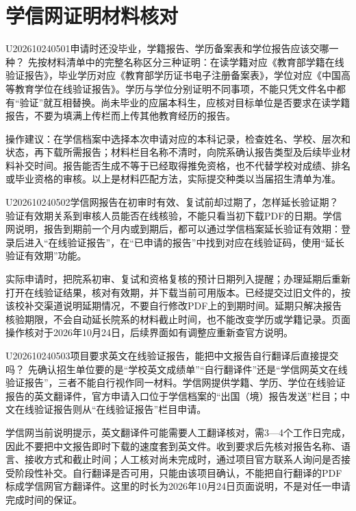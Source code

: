 \section{学信网证明材料核对}
\begin{qa}{U202610240501}{申请时还没毕业，学籍报告、学历备案表和学位报告应该交哪一种？}
先按材料清单中的完整名称区分三种证明：在读学籍对应《教育部学籍在线验证报告》，毕业学历对应《教育部学历证书电子注册备案表》，学位对应《中国高等教育学位在线验证报告》。学历与学位分别证明不同事项，不能只凭文件名中都有“验证”就互相替换。尚未毕业的应届本科生，应核对目标单位是否要求在读学籍报告，不要为填满上传栏而上传其他教育经历的报告。

操作建议：在学信档案中选择本次申请对应的本科记录，检查姓名、学校、层次和状态，再下载所需报告；材料栏目名称不清时，向院系确认报告类型及后续毕业材料补交时间。报告能否生成不等于已经取得推免资格，也不代替学校对成绩、排名或毕业资格的审核。以上是材料匹配方法，实际提交种类以当届招生清单为准。
\end{qa}
\begin{qa}{U202610240502}{学信网报告在初审时有效、复试前却过期了，怎样延长验证期？}
验证有效期关系到审核人员能否在线核验，不能只看当初下载PDF的日期。学信网说明，报告到期前一个月内或到期后，都可以通过学信档案延长验证有效期：登录后进入“在线验证报告”，在“已申请的报告”中找到对应在线验证码，使用“延长验证有效期”功能。

实际申请时，把院系初审、复试和资格复核的预计日期列入提醒；办理延期后重新打开在线验证结果，核对有效期，并下载当前可用版本。已经提交过旧文件的，按该校补交渠道说明延期情况，不要自行修改PDF上的到期时间。延期只解决报告核验期限，不会自动延长院系的材料截止时间，也不能改变学历或学籍记录。页面操作核对于2026年10月24日，后续界面如有调整应重新查官方说明。
\end{qa}
\begin{qa}{U202610240503}{项目要求英文在线验证报告，能把中文报告自行翻译后直接提交吗？}
先确认招生单位要的是“学校英文成绩单”“自行翻译件”还是“学信网英文在线验证报告”，三者不能自行视作同一材料。学信网提供学籍、学历、学位在线验证报告的英文翻译件，官方申请入口位于学信档案的“出国（境）报告发送”栏目；中文在线验证报告则从“在线验证报告”栏目申请。

学信网当前说明提示，英文翻译件可能需要人工翻译核对，需3—4个工作日完成，因此不要把中文报告即时下载的速度套到英文件。收到要求后先核对报告名称、语言、接收方式和截止时间；人工核对尚未完成时，通过项目官方联系人询问是否接受阶段性补交。自行翻译是否可用，只能由该项目确认，不能把自行翻译的PDF标成学信网官方翻译件。这里的时长为2026年10月24日页面说明，不是对任一申请完成时间的保证。
\end{qa}
